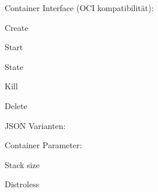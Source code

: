 \begin{notes}
    \item Container Interface (OCI kompatibilität):
    \begin{notes}
        \item Create
        \item Start
        \item State
        \item Kill
        \item Delete
    \end{notes}
    \begin{notes}
        \item JSON Varianten:
        \item    
        \item     
    \end{notes}
    \item Container Parameter:
    \begin{notes}
        \item Stack size
        \item Distroless
        \item 
    \end{notes}
\end{notes}

